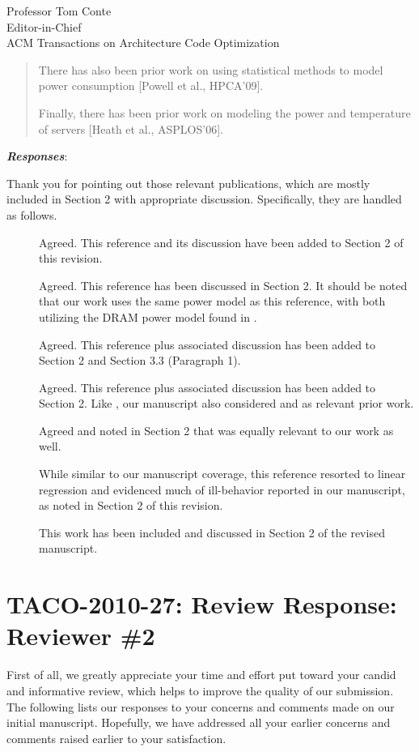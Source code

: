 \documentclass[10pt]{letter} %
\newcommand{\rviewresponses}{\textbf{\textit{Responses}}:}
\begin{document}
\begin{letter}{Professor Tom Conte \\
Editor-in-Chief \\
ACM Transactions on Architecture Code Optimization }
\begin{quote}
\begin{itshape}
    There has also been prior work on using statistical methods to model
    power consumption [Powell et al., HPCA'09].

    Finally, there has been prior work on modeling the power and
    temperature of servers [Heath et al., ASPLOS'06].
  \end{itshape}
\end{quote}

\rviewresponses

Thank you for pointing out those relevant publications,
which are mostly included in Section 2 with appropriate discussion.  Specifically, they are handled as follows.
\begin{description}
\item[\cite{Skadron2003,Skadron2004}] Agreed.  This reference and its
  discussion have been added to Section 2 of this revision.
\item[\cite{Liu2008}] Agreed. This reference has been discussed in
  Section 2.  It should be noted that our work uses the same power model
  as this reference, with both utilizing the DRAM power model found in
  \cite{Micron2007}.
\item[\cite{Gurumurthi2005}] Agreed. This reference plus associated
  discussion has been added to Section 2 and Section 3.3 (Paragraph 1).
\item[\cite{Ware2010}] Agreed. This reference plus associated discussion
  has been added to Section 2.  Like \cite{Ware2010}, our manuscript
  also considered \cite{Brochard2010} and \cite{Rajamani2010} as
  relevant prior work.
\item[\cite{MesaMartinez2010}] Agreed and noted in Section 2 that \cite{Mesamartinez2007} was equally relevant to our work as well.
\item[\cite{Powell2009}] While similar to our manuscript coverage, this
  reference resorted to linear regression and evidenced much of
  ill-behavior reported in our manuscript, as noted in Section 2 of this
  revision.
\item[\cite{Heath2006}] This work has been included and discussed in
  Section 2 of the revised manuscript.
\end{description}


\clearpage
\section{TACO-2010-27: Review Response: Reviewer \#2}
\label{sec-2}
First of all, we greatly appreciate your time and effort put toward
your candid and informative review, which helps to improve the quality
of our submission.  The following lists our responses to your concerns
and comments made on our initial manuscript.  Hopefully, we have addressed
all your earlier concerns and comments raised earlier to your
satisfaction.


\end{letter}
\end{document}
